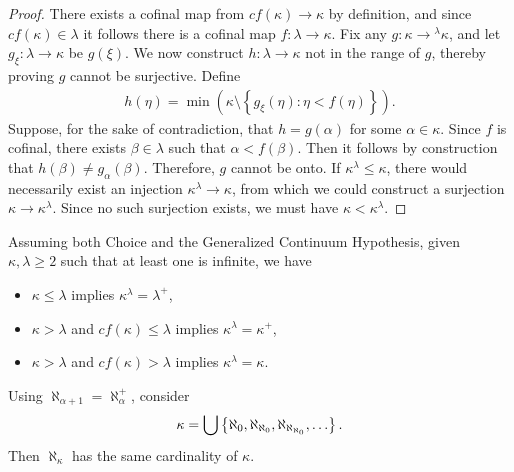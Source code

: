 \begin{proof}
    There exists a cofinal map from $cf(\kappa) \to \kappa$ by definition, and since $cf(\kappa) \in \lambda$ it follows there is a cofinal map $f: \lambda \to \kappa$. Fix any $g: \kappa \to {}^{\lambda}\kappa$, and let $g_{\xi}: \lambda \to \kappa$ be $g(\xi)$. We now construct $h: \lambda \to \kappa$ not in the range of $g$, thereby proving $g$ cannot be surjective. Define
    \begin{align*}
        h(\eta) = \min\left(\kappa \setminus \left\{g_{\xi}(\eta) : \eta < f(\eta)\right\}\right).
    \end{align*}
    Suppose, for the sake of contradiction, that $h = g(\alpha)$ for some $\alpha \in \kappa$. Since $f$ is cofinal, there exists $\beta \in \lambda$ such that $\alpha < f(\beta)$. Then it follows by construction that $h(\beta) \neq g_{\alpha}(\beta)$. Therefore, $g$ cannot be onto. If $\kappa^{\lambda} \leq \kappa$, there would necessarily exist an injection $\kappa^{\lambda} \to \kappa$, from which we could construct a surjection $\kappa \to \kappa^{\lambda}$. Since no such surjection exists, we must have $\kappa < \kappa^{\lambda}$.
\end{proof}

\begin{lemma}
    Assuming both Choice and the Generalized Continuum Hypothesis, given $\kappa, \lambda \geq 2$ such that at least one is infinite, we have
    \begin{itemize}
        \item $\kappa \leq \lambda$ implies $\kappa^{\lambda} = \lambda^{+}$,
        \item $\kappa > \lambda$ and $cf(\kappa) \leq \lambda$ implies $\kappa^{\lambda} = \kappa^{+}$,
        \item $\kappa > \lambda$ and $cf(\kappa) > \lambda$ implies $\kappa^{\lambda} = \kappa$.
    \end{itemize}
\end{lemma}

\begin{rmk}
    Using $\aleph_{\alpha+1} = \aleph_{\alpha}^{+}$, consider
    \begin{align*}
        \kappa = \bigcup\left\{\aleph_{0}, \aleph_{\aleph_0}, \aleph_{\aleph_{\aleph_0}}, \ldots\right\}.
    \end{align*}
    Then $\aleph_{\kappa}$ has the same cardinality of $\kappa$.
\end{rmk}
